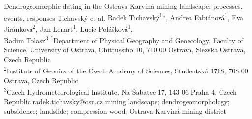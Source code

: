 \abstract
{Dendrogeomorphic dating in the Ostrava-Karviná mining landscape: processes, events, responses} %
{Tichavský et al.} %
{Radek Tichavský\textsuperscript{1}*, Andrea Fabiánová\textsuperscript{1}, Eva Jiránková\textsuperscript{2}, Jan Lenart\textsuperscript{1}, Lucie Polášková\textsuperscript{1}, \\Radim Tolasz\textsuperscript{3}
} %
{\TLtag} %
{
\textsuperscript{1}Department of Physical Geography and Geoecology, Faculty of Science, University of Ostrava, Chittussiho 10, 710 00 Ostrava, Slezská Ostrava, Czech Republic\\
\textsuperscript{2}Institute of Geonics of the Czech Academy of Sciences, Studentská 1768, 708 00 Ostrava, Czech Republic\\
\textsuperscript{3}Czech Hydrometeorological Institute, Na Šabatce 17, 143 06 Praha 4, Czech Republic
} %
{radek.tichavsky@osu.cz}  %
{mining landscape; dendrogeomorphology; subsidence; landslide; compression wood; Ostrava-Karviná mining district}%

